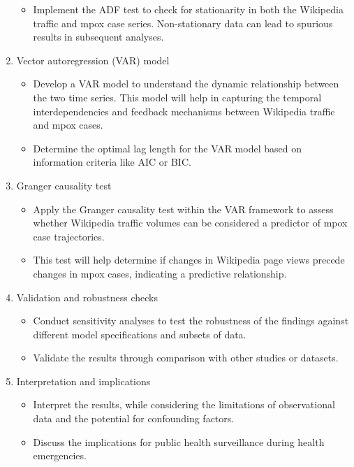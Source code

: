 \documentclass[
  12pt,
]{article}
\providecommand{\tightlist}{%
  \setlength{\itemsep}{0pt}\setlength{\parskip}{0pt}}\usepackage{longtable,booktabs,array}
\begin{document}
\begin{enumerate}
  \begin{itemize}
  \tightlist
  \item
    Implement the ADF test to check for stationarity in both the
    Wikipedia traffic and mpox case series. Non-stationary data can lead
    to spurious results in subsequent analyses.
  \end{itemize}
\item
  Vector autoregression (VAR) model

  \begin{itemize}
  \tightlist
  \item
    Develop a VAR model to understand the dynamic relationship between
    the two time series. This model will help in capturing the temporal
    interdependencies and feedback mechanisms between Wikipedia traffic
    and mpox cases.
  \item
    Determine the optimal lag length for the VAR model based on
    information criteria like AIC or BIC.
  \end{itemize}
\item
  Granger causality test

  \begin{itemize}
  \tightlist
  \item
    Apply the Granger causality test within the VAR framework to assess
    whether Wikipedia traffic volumes can be considered a predictor of
    mpox case trajectories.
  \item
    This test will help determine if changes in Wikipedia page views
    precede changes in mpox cases, indicating a predictive relationship.
  \end{itemize}
\item
  Validation and robustness checks

  \begin{itemize}
  \tightlist
  \item
    Conduct sensitivity analyses to test the robustness of the findings
    against different model specifications and subsets of data.
  \item
    Validate the results through comparison with other studies or
    datasets.
  \end{itemize}
\item
  Interpretation and implications

  \begin{itemize}
  \tightlist
  \item
    Interpret the results, while considering the limitations of
    observational data and the potential for confounding factors.
  \item
    Discuss the implications for public health surveillance during
    health emergencies.
  \end{itemize}
\end{enumerate}
\end{document}
